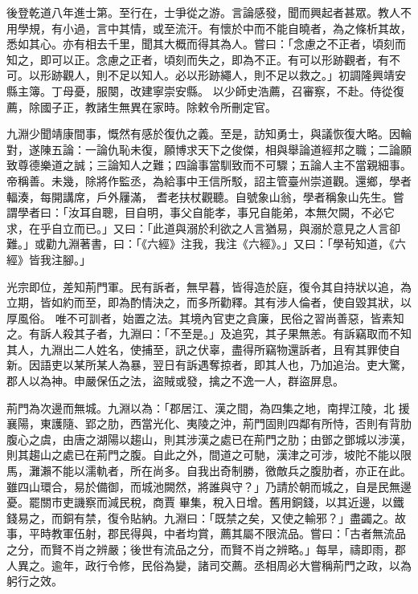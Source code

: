 \begin{pinyinscope}
 後登乾道八年進士第。至行在，士爭從之游。言論感發，聞而興起者甚眾。教人不用學規，有小過，言中其情，或至流汗。有懷於中而不能自曉者，為之條析其故，悉如其心。亦有相去千里，聞其大概而得其為人。嘗曰：「念慮之不正者，頃刻而知之，即可以正。念慮之正者，頃刻而失之，即為不正。有可以形跡觀者，有不可。以形跡觀人，則不足以知人。必以形跡繩人，則不足以救之。」初調隆興靖安縣主簿。丁母憂，服闋，改建寧崇安縣。
 以少師史浩薦，召審察，不赴。侍從復薦，除國子正，教諸生無異在家時。除敕令所刪定官。



 九淵少聞靖康間事，慨然有感於復仇之義。至是，訪知勇士，與議恢復大略。因輪對，遂陳五論：一論仇恥未復，願博求天下之俊傑，相與舉論道經邦之職；二論願致尊德樂道之誠；三論知人之難；四論事當馴致而不可驟；五論人主不當親細事。帝稱善。未幾，除將作監丞，為給事中王信所駁，詔主管臺州崇道觀。還鄉，學者輻湊，每開講席，戶外屨滿，
 耆老扶杖觀聽。自號象山翁，學者稱象山先生。嘗謂學者曰：「汝耳自聰，目自明，事父自能孝，事兄自能弟，本無欠闕，不必它求，在乎自立而已。」又曰：「此道與溺於利欲之人言猶易，與溺於意見之人言卻難。」或勸九淵著書，曰：「《六經》注我，我注《六經》。」又曰：「學茍知道，《六經》皆我注腳。」



 光宗即位，差知荊門軍。民有訴者，無早暮，皆得造於庭，復令其自持狀以追，為立期，皆如約而至，即為酌情決之，而多所勸釋。其有涉人倫者，使自毀其狀，以厚風俗。
 唯不可訓者，始置之法。其境內官吏之貪廉，民俗之習尚善惡，皆素知之。有訴人殺其子者，九淵曰：「不至是。」及追究，其子果無恙。有訴竊取而不知其人，九淵出二人姓名，使捕至，訊之伏辜，盡得所竊物還訴者，且宥其罪使自新。因語吏以某所某人為暴，翌日有訴遇奪掠者，即其人也，乃加追治。吏大驚，郡人以為神。申嚴保伍之法，盜賊或發，擒之不逸一人，群盜屏息。



 荊門為次邊而無城。九淵以為：「郡居江、漢之間，為四集之地，南捍江陵，北
 援襄陽，東護隨、郢之肋，西當光化、夷陵之沖，荊門固則四鄰有所恃，否則有背肋腹心之虞，由唐之湖陽以趨山，則其涉漢之處已在荊門之肋；由鄧之鄧城以涉漢，則其趨山之處已在荊門之腹。自此之外，間道之可馳，漢津之可涉，坡陀不能以限馬，灘瀨不能以濡軌者，所在尚多。自我出奇制勝，徼敵兵之腹肋者，亦正在此。雖四山環合，易於備御，而城池闕然，將誰與守？」乃請於朝而城之，自是民無邊憂。罷關市吏譏察而減民稅，商賈
 畢集，稅入日增。舊用銅錢，以其近邊，以鐵錢易之，而銅有禁，復令貼納。九淵曰：「既禁之矣，又使之輸邪？」盡蠲之。故事，平時教軍伍射，郡民得與，中者均賞，薦其屬不限流品。嘗曰：「古者無流品之分，而賢不肖之辨嚴；後世有流品之分，而賢不肖之辨略。」每旱，禱即雨，郡人異之。逾年，政行令修，民俗為變，諸司交薦。丞相周必大嘗稱荊門之政，以為躬行之效。




\end{pinyinscope}
